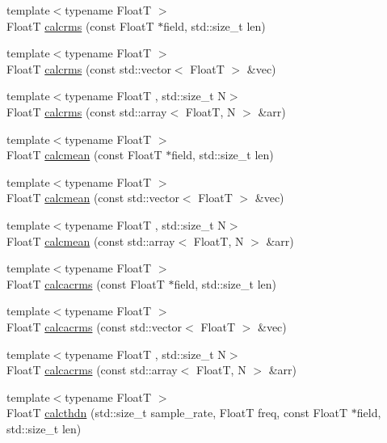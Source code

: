 \begin{DoxyCompactItemize}
\item 
{\footnotesize template$<$typename FloatT $>$ }\\FloatT \hyperlink{namespacedevfix_1_1dsp_a1d758c2b667d7d48c41677641086387f}{calcrms} (const FloatT $\ast$field, std\+::size\+\_\+t len)
\item 
{\footnotesize template$<$typename FloatT $>$ }\\FloatT \hyperlink{namespacedevfix_1_1dsp_a18e7f97d5726a6273908d87a480446a5}{calcrms} (const std\+::vector$<$ FloatT $>$ \&vec)
\item 
{\footnotesize template$<$typename FloatT , std\+::size\+\_\+t N$>$ }\\FloatT \hyperlink{namespacedevfix_1_1dsp_a19c2e4d076954efbf0dab3daded46ba7}{calcrms} (const std\+::array$<$ FloatT, N $>$ \&arr)
\item 
{\footnotesize template$<$typename FloatT $>$ }\\FloatT \hyperlink{namespacedevfix_1_1dsp_acc73b4642ca4cb49621e76efc6732186}{calcmean} (const FloatT $\ast$field, std\+::size\+\_\+t len)
\item 
{\footnotesize template$<$typename FloatT $>$ }\\FloatT \hyperlink{namespacedevfix_1_1dsp_ab8e51dea953cabfc246e2e45fbff010c}{calcmean} (const std\+::vector$<$ FloatT $>$ \&vec)
\item 
{\footnotesize template$<$typename FloatT , std\+::size\+\_\+t N$>$ }\\FloatT \hyperlink{namespacedevfix_1_1dsp_a9f44af4b1a42d61d8a52afb7a5628001}{calcmean} (const std\+::array$<$ FloatT, N $>$ \&arr)
\item 
{\footnotesize template$<$typename FloatT $>$ }\\FloatT \hyperlink{namespacedevfix_1_1dsp_a844dcfe9edcac8ffc347b67f561dd46a}{calcacrms} (const FloatT $\ast$field, std\+::size\+\_\+t len)
\item 
{\footnotesize template$<$typename FloatT $>$ }\\FloatT \hyperlink{namespacedevfix_1_1dsp_a1540e2d4c0a38da18dc948c84823ad73}{calcacrms} (const std\+::vector$<$ FloatT $>$ \&vec)
\item 
{\footnotesize template$<$typename FloatT , std\+::size\+\_\+t N$>$ }\\FloatT \hyperlink{namespacedevfix_1_1dsp_aedca7ae194c9a13164a2fdf91f37545a}{calcacrms} (const std\+::array$<$ FloatT, N $>$ \&arr)
\item 
{\footnotesize template$<$typename FloatT $>$ }\\FloatT \hyperlink{namespacedevfix_1_1dsp_a1982c6b562b8c196dd3322c207c0ac86}{calcthdn} (std\+::size\+\_\+t sample\+\_\+rate, FloatT freq, const FloatT $\ast$field, std\+::size\+\_\+t len)

\end{DoxyCompactItemize}
